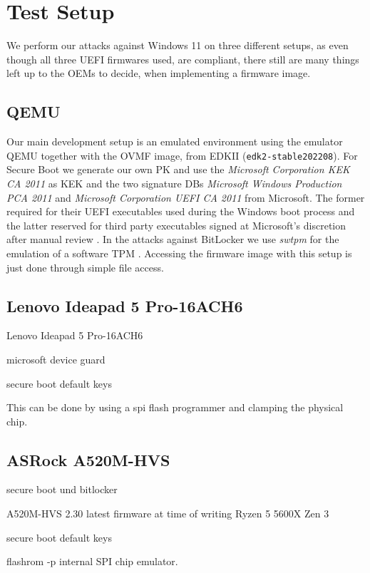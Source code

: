 
\chapter{Test Setup}
\label{sec:test-setup}

We perform our attacks against Windows 11 on three different setups, as even though all three \ac{UEFI} firmwares used, are \cite{pi-spec} compliant, there still are many things left up to the \acp{OEM} to decide, when implementing a firmware image.

\section{\acs{QEMU}}
\label{sec:test-setup:qemu}

Our main development setup is an emulated environment using the emulator \ac{QEMU}\cite{qemu} together with the \ac{OVMF} image, from \ac{EDK}II (\lstinline{edk2-stable202208}).
For Secure Boot we generate our own \ac{PK} and use the \emph{Microsoft Corporation \acs{KEK} \acs{CA} 2011} as \ac{KEK} and the two signature \acp{DB} \emph{Microsoft Windows Production PCA 2011} and \emph{Microsoft Corporation UEFI CA 2011} from Microsoft. The former required for their \ac{UEFI} executables used during the Windows boot process \cite{microsoft-secure-boot-guidance} and the latter reserved for third party executables signed at Microsoft's discretion after manual review \cite{microsoft-uefi-signing}.
In the attacks against BitLocker we use \emph{swtpm} for the emulation of a software \ac{TPM} \cite{swtpm}. Accessing the firmware image with this setup is just done through simple file access.

\section{Lenovo Ideapad 5 Pro-16ACH6}
\label{sec:test-setup:lenovo}

Lenovo Ideapad 5 Pro-16ACH6


microsoft device guard

secure boot default keys


This can be done by using a spi flash programmer and clamping the physical chip. 

\section{ASRock A520M-HVS}
\label{sec:test-setup:asrock}



secure boot und bitlocker


A520M-HVS 2.30 latest firmware at time of writing
Ryzen 5 5600X Zen 3

secure boot default keys


flashrom -p internal
SPI chip emulator. 
